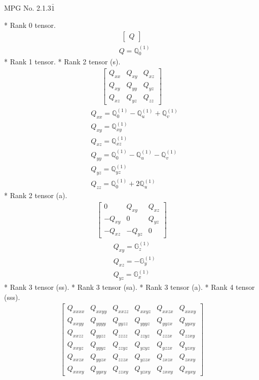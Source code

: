 \documentclass[fleqn,8pt,landscape]{jsarticle}
\begin{document}
\setcounter{MaxMatrixCols}{32}

\renewcommand{\tablename}{Table~}
\renewcommand{\figurename}{Figure~}
\begin{center}
\LARGE
MPG No. 2.1.3\quad$\bar{1}$
\end{center}
* Rank 0 tensor.
\begin{align*}
\begin{bmatrix} Q \end{bmatrix}
\end{align*}
\begin{align*}
& Q = \mathbb{Q}_{0}^{(1)}
\end{align*}
* Rank 1 tensor.
* Rank 2 tensor (s).
\begin{align*}
\begin{bmatrix} Q_{xx} & Q_{xy} & Q_{xz} \\ Q_{xy} & Q_{yy} & Q_{yz} \\ Q_{xz} & Q_{yz} & Q_{zz} \end{bmatrix}
\end{align*}
\begin{align*}
& Q_{xx} = \mathbb{Q}_{0}^{(1)} - \mathbb{Q}_{u}^{(1)} + \mathbb{Q}_{v}^{(1)} \\
& Q_{xy} = \mathbb{Q}_{xy}^{(1)} \\
& Q_{xz} = \mathbb{Q}_{xz}^{(1)} \\
& Q_{yy} = \mathbb{Q}_{0}^{(1)} - \mathbb{Q}_{u}^{(1)} - \mathbb{Q}_{v}^{(1)} \\
& Q_{yz} = \mathbb{Q}_{yz}^{(1)} \\
& Q_{zz} = \mathbb{Q}_{0}^{(1)} + 2 \mathbb{Q}_{u}^{(1)}
\end{align*}
* Rank 2 tensor (a).
\begin{align*}
\begin{bmatrix} 0 & Q_{xy} & Q_{xz} \\ - Q_{xy} & 0 & Q_{yz} \\ - Q_{xz} & - Q_{yz} & 0 \end{bmatrix}
\end{align*}
\begin{align*}
& Q_{xy} = \mathbb{G}_{z}^{(1)} \\
& Q_{xz} = - \mathbb{G}_{y}^{(1)} \\
& Q_{yz} = \mathbb{G}_{x}^{(1)}
\end{align*}
* Rank 3 tensor (ss).
* Rank 3 tensor (sa).
* Rank 3 tensor (a).
* Rank 4 tensor (sss).
\begin{align*}
\begin{bmatrix} Q_{xxxx} & Q_{xxyy} & Q_{xxzz} & Q_{xxyz} & Q_{xxzx} & Q_{xxxy} \\ Q_{xxyy} & Q_{yyyy} & Q_{yyzz} & Q_{yyyz} & Q_{yyzx} & Q_{yyxy} \\ Q_{xxzz} & Q_{yyzz} & Q_{zzzz} & Q_{zzyz} & Q_{zzzx} & Q_{zzxy} \\ Q_{xxyz} & Q_{yyyz} & Q_{zzyz} & Q_{yzyz} & Q_{yzzx} & Q_{yzxy} \\ Q_{xxzx} & Q_{yyzx} & Q_{zzzx} & Q_{yzzx} & Q_{zxzx} & Q_{zxxy} \\ Q_{xxxy} & Q_{yyxy} & Q_{zzxy} & Q_{yzxy} & Q_{zxxy} & Q_{xyxy} \end{bmatrix}
\end{align*}
\end{document}
